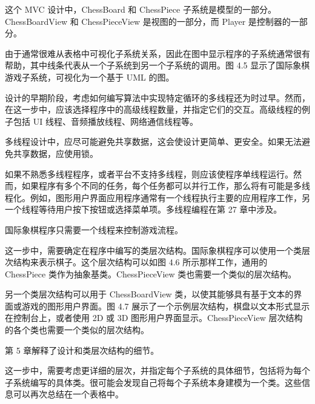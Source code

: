 这个 MVC 设计中，ChessBoard 和 ChessPiece 子系统是模型的一部分。ChessBoardView 和 ChessPieceView 是视图的一部分，而 Player 是控制器的一部分。

由于通常很难从表格中可视化子系统关系，因此在图中显示程序的子系统通常很有帮助，其中线条代表从一个子系统到另一个子系统的调用。图 4.5 显示了国际象棋游戏子系统，可视化为一个基于 UML 的图。



设计的早期阶段，考虑如何编写算法中实现特定循环的多线程还为时过早。然而，在这一步中，应该选择程序中的高级线程数量，并指定它们的交互。高级线程的例子包括 UI 线程、音频播放线程、网络通信线程等。

多线程设计中，应尽可能避免共享数据，这会使设计更简单、更安全。如果无法避免共享数据，应使用锁。

如果不熟悉多线程程序，或者平台不支持多线程，则应该使程序单线程运行。然而，如果程序有多个不同的任务，每个任务都可以并行工作，那么将有可能是多线程化。例如，图形用户界面应用程序通常有一个线程执行主要的应用程序工作，另一个线程等待用户按下按钮或选择菜单项。多线程编程在第 27 章中涉及。

国际象棋程序只需要一个线程来控制游戏流程。


这一步中，需要确定在程序中编写的类层次结构。国际象棋程序可以使用一个类层次结构来表示棋子。这个层次结构可以如图 4.6 所示那样工作，通用的 ChessPiece 类作为抽象基类。ChessPieceView 类也需要一个类似的层次结构。


另一个类层次结构可以用于 ChessBoardView 类，以使其能够具有基于文本的界面或游戏的图形用户界面。图 4.7 展示了一个示例层次结构，棋盘以文本形式显示在控制台上，或者使用 2D 或 3D 图形用户界面显示。ChessPieceView 层次结构的各个类也需要一个类似的层次结构。


第 5 章解释了设计和类层次结构的细节。


这一步中，需要考虑更详细的层次，并指定每个子系统的具体细节，包括将为每个子系统编写的具体类。很可能会发现自己将每个子系统本身建模为一个类。这些信息可以再次总结在一个表格中。

